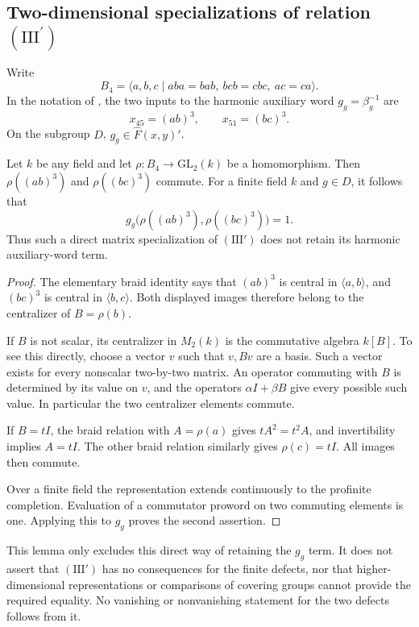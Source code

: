 \subsection{Two-dimensional specializations of relation $(\mathrm{III}^\prime)$}

Write
\[
 B_4=\langle a,b,c\mid aba=bab,\ bcb=cbc,\ ac=ca\rangle.
\]
In the notation of \cite[\S10, Theorem~20]{H17}, the two inputs
to the harmonic auxiliary word $g_g=\beta_g^{-1}$ are
\[
 x_{45}=(ab)^3,\qquad x_{51}=(bc)^3.
\]
On the subgroup $D$, $g_g\in\widehat F(x,y)'$.

\begin{lemma}\label{lem:iii-prime-two-dimensional}
Let $k$ be any field and let $\rho:B_4\to\mathrm{GL}_2(k)$ be
a homomorphism.  Then $\rho((ab)^3)$ and $\rho((bc)^3)$ commute.
For a finite field $k$ and $g\in D$, it follows that
\[
 g_g\bigl(\rho((ab)^3),\rho((bc)^3)\bigr)=1.
\]
Thus such a direct matrix specialization of $(\mathrm{III}')$
does not retain its harmonic auxiliary-word term.
\end{lemma}
\begin{proof}
The elementary braid identity says that $(ab)^3$ is central in
$\langle a,b\rangle$, and $(bc)^3$ is central in
$\langle b,c\rangle$.  Both displayed images therefore belong
to the centralizer of $B=\rho(b)$.

If $B$ is not scalar, its centralizer in $M_2(k)$ is the
commutative algebra $k[B]$.  To see this directly, choose a vector
$v$ such that $v,Bv$ are a basis.  Such a vector exists for every
nonscalar two-by-two matrix.  An operator commuting with $B$ is
determined by its value on $v$, and the operators $\alpha I+\beta B$
give every possible such value.  In particular the two centralizer
elements commute.

If $B=tI$, the braid relation with $A=\rho(a)$ gives
$tA^2=t^2A$, and invertibility implies $A=tI$.  The other braid
relation similarly gives $\rho(c)=tI$.  All images then commute.

Over a finite field the representation extends continuously to
the profinite completion.  Evaluation of a commutator proword on
two commuting elements is one.  Applying this to $g_g$ proves the
second assertion.
\end{proof}

This lemma only excludes this direct way of retaining the
$g_g$ term.  It does not assert that $(\mathrm{III}')$ has no
consequences for the finite defects, nor that higher-dimensional
representations or comparisons of covering groups cannot provide
the required equality.  No vanishing or nonvanishing statement for
the two defects follows from it.
